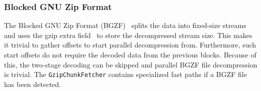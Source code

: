 \subsubsection{Blocked GNU Zip Format}

The Blocked GNU Zip Format (BGZF)~\cite{htslib} splits the data into fixed-size streams and uses the gzip extra field~\cite{RFC1952} to store the decompressed stream size.
This makes it trivial to gather  offsets to start parallel decompression from.
Furthermore, such start offsets do not require the decoded data from the previous blocks.
Because of this, the two-stage decoding can be skipped and parallel BGZF file decompression is trivial.
The \texttt{GzipChunkFetcher} contains specialized fast paths if a BGZF file has been detected.
